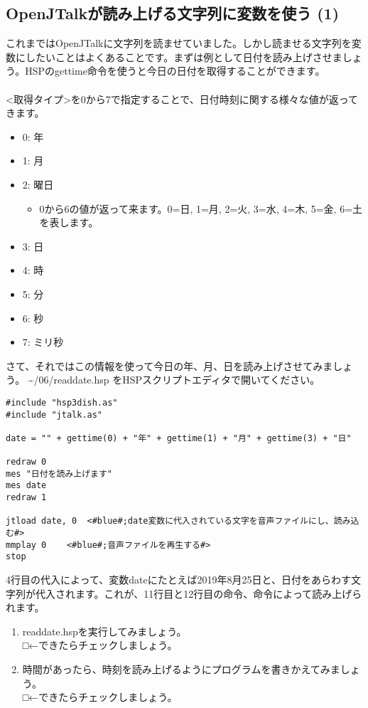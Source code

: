 \subsection{OpenJTalkが読み上げる文字列に変数を使う (1)}
これまではOpenJTalkに文字列を読ませていました。しかし読ませる文字列を変数にしたいことはよくあることです。まずは例として日付を読み上げさせましょう。HSPのgettime命令を使うと今日の日付を取得することができます。\\
\\
<取得タイプ>を0から7で指定することで、日付時刻に関する様々な値が返ってきます。
\begin{itemize}
\item 0: 年
\item 1: 月
\item 2: 曜日
\begin{itemize}
 \item 0から6の値が返って来ます。0=日, 1=月, 2=火, 3=水, 4=木, 5=金, 6=土 を表します。
\end{itemize}
\item 3: 日
\item 4: 時
\item 5: 分
\item 6: 秒
\item 7: ミリ秒
\end{itemize}
さて、それではこの情報を使って今日の年、月、日を読み上げさせてみましょう。 \textasciitilde /06/readdate.hsp をHSPスクリプトエディタで開いてください。\\

\begin{lstlisting}[caption=readdate.hsp,label=readdate.hsp]
#include "hsp3dish.as"
#include "jtalk.as"

date = "" + gettime(0) + "年" + gettime(1) + "月" + gettime(3) + "日"

redraw 0
mes "日付を読み上げます"
mes date
redraw 1

jtload date, 0	<#blue#;date変数に代入されている文字を音声ファイルにし、読み込む#>
mmplay 0	<#blue#;音声ファイルを再生する#>
stop
\end{lstlisting}

4行目の代入によって、変数dateにたとえば2019年8月25日と、日付をあらわす文字列が代入されます。これが、11行目と12行目の命令、命令によって読み上げられます。\\

\begin{tcolorbox}[title=\useOmetoi]
\begin{enumerate}
\item readdate.hspを実行してみましょう。\\□←できたらチェックしましょう。
\item 時間があったら、時刻を読み上げるようにプログラムを書きかえてみましょう。\\□←できたらチェックしましょう。
\end{enumerate}
\end{tcolorbox}
